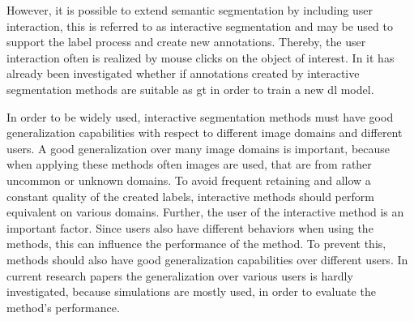 However, it is possible to extend semantic segmentation by including user interaction, this is referred to as interactive segmentation and may be used to support the label process and create new annotations. 
Thereby, the user interaction often is realized by mouse clicks on the object of interest.
In \cite{Man18-DEXTR} it has already been investigated whether if annotations created by interactive segmentation methods are suitable as \gls{gt} in order to train a new \gls{dl} model.

In order to be widely used, interactive segmentation methods must have good generalization capabilities with respect to different image domains and different users.
A good generalization over many image domains is important, because when applying these methods often images are used, that are from rather uncommon or unknown domains.
To avoid frequent retaining and allow a constant quality of the created labels, interactive methods should perform equivalent on various domains.
Further, the user of the interactive method is an important factor.
Since users also have different behaviors when using the methods, this can influence the performance of the method.
To prevent this, methods should also have good generalization capabilities over different users.
In current research papers the generalization over various users is hardly investigated, because simulations are mostly used, in order to evaluate the method's performance.

